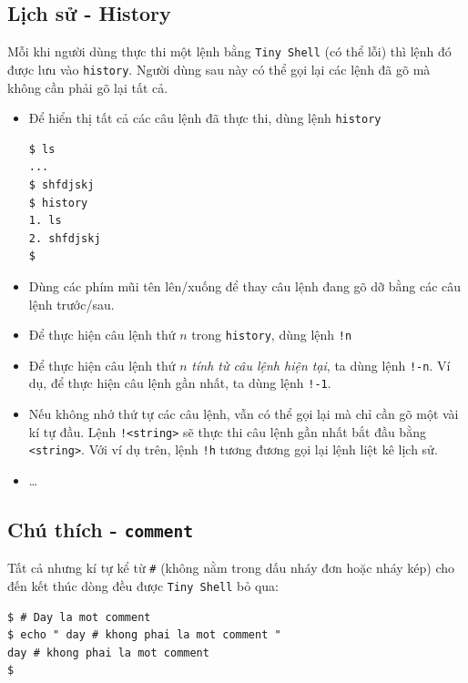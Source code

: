 \documentclass[a4paper,12pt]{report}
\begin{document}
        \subsection{Lịch sử - History}
        Mỗi khi người dùng thực thi một lệnh bằng \texttt{Tiny Shell} (có thể
        lỗi) thì lệnh đó được lưu vào \texttt{history}. Người dùng sau này có
        thể gọi lại các lệnh đã gõ mà không cần phải gõ lại tất cả.
        \begin{itemize}
            \item Để hiển thị tất cả các câu lệnh đã thực thi, dùng lệnh
                \texttt{history}
                \begin{verbatim}
$ ls
...
$ shfdjskj
$ history
1. ls
2. shfdjskj
$
                \end{verbatim}
            \item Dùng các phím mũi tên lên/xuống để thay câu lệnh đang gõ dỡ
                bằng các câu lệnh trước/sau.
            \item Để thực hiện câu lệnh thứ $n$ trong \texttt{history}, dùng
                lệnh \texttt{!n}
            \item Để thực hiện câu lệnh thứ $n$ \textit{tính từ câu lệnh hiện
                tại}, ta dùng lệnh \texttt{!-n}. Ví dụ, để thực hiện câu lệnh
                gần nhất, ta dùng lệnh \texttt{!-1}.
            \item Nếu không nhớ thứ tự các câu lệnh, vẫn có thể gọi lại mà chỉ
                cần gõ một vài kí tự đầu. Lệnh \texttt{!<string>} sẽ thực thi
                câu lệnh gần nhất bắt đầu bằng \texttt{<string>}. Với ví dụ
                trên, lệnh \texttt{!h} tương đương gọi lại lệnh liệt kê lịch
                sử.
            \item \ldots{}
        \end{itemize}

        \subsection{Chú thích - \texttt{comment}}
        Tất cả nhưng kí tự kể từ \texttt{\#} (không nằm trong dấu nháy đơn
        hoặc nháy kép) cho đến kết thúc dòng đều được \texttt{Tiny Shell}
        bỏ qua:
        \begin{verbatim}
$ # Day la mot comment
$ echo " day # khong phai la mot comment "
day # khong phai la mot comment
$
        \end{verbatim}
\end{document}
